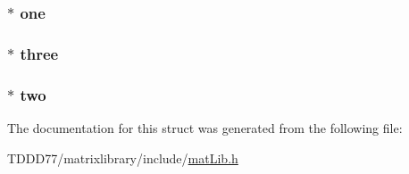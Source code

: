 \subsubsection[{one}]{$\ast$ one}\label{structmatrices_ad97a9cc9eeba5aca384adb75d6f55523}
\hypertarget{structmatrices_aae2403a9b85add9395f1e8849c7ead97}{}
\subsubsection[{three}]{$\ast$ three}\label{structmatrices_aae2403a9b85add9395f1e8849c7ead97}
\hypertarget{structmatrices_a31cb6e4fadb7864f73c08b64b117458b}{}
\subsubsection[{two}]{$\ast$ two}\label{structmatrices_a31cb6e4fadb7864f73c08b64b117458b}


The documentation for this struct was generated from the following file\+:\begin{DoxyCompactItemize}
\item 
T\+D\+D\+D77/matrixlibrary/include/\hyperlink{mat_lib_8h}{mat\+Lib.\+h}\end{DoxyCompactItemize}
